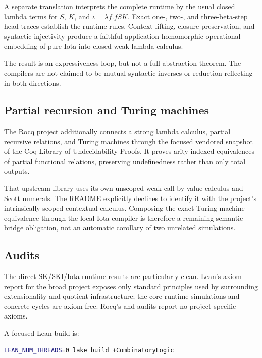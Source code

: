 \documentclass[
  10pt,
  a4paper,
  twoside,
  open=any,
  parskip=half,
  headings=big
]{scrreprt}
\newcommand{\code}[1]{\texttt{\detokenize{#1}}}
\begin{document}
A separate translation interprets the complete runtime by the usual closed lambda terms for $S$, $K$, and $\iota=\lambda f.fSK$. Exact one-, two-, and three-beta-step head traces establish the runtime rules. Context lifting, closure preservation, and syntactic injectivity produce a faithful application-homomorphic operational embedding of pure Iota into closed weak lambda calculus.

The result is an expressiveness loop, but not a full abstraction theorem. The compilers are not claimed to be mutual syntactic inverses or reduction-reflecting in both directions.

\subsection{Partial recursion and Turing machines}

The Rocq project additionally connects a strong lambda calculus, partial recursive relations, and Turing machines through the focused vendored snapshot of the Coq Library of Undecidability Proofs. It proves arity-indexed equivalences of partial functional relations, preserving undefinedness rather than only total outputs.

That upstream library uses its own unscoped weak-call-by-value calculus and Scott numerals. The README explicitly declines to identify it with the project's intrinsically scoped contextual calculus. Composing the exact Turing-machine equivalence through the local Iota compiler is therefore a remaining semantic-bridge obligation, not an automatic corollary of two unrelated simulations.

\subsection{Audits}

The direct SK/SKI/Iota runtime results are particularly clean. Lean's axiom report for the broad project exposes only standard principles used by surrounding extensionality and quotient infrastructure; the core runtime simulations and concrete cycles are axiom-free. Rocq's \code{Print Assumptions} and \code{coqchk} audits report no project-specific axioms.

A focused Lean build is:

\begin{lstlisting}[language=bash]
LEAN_NUM_THREADS=0 lake build +CombinatoryLogic
\end{lstlisting}
\end{document}
